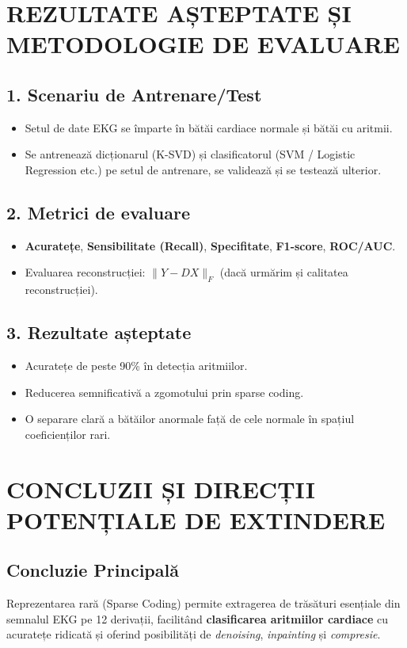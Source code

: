 \documentclass[12pt]{article}  %
\begin{document}
\section{REZULTATE AȘTEPTATE ȘI METODOLOGIE DE EVALUARE}

\subsection*{1. Scenariu de Antrenare/Test}
\begin{itemize}
    \item Setul de date EKG se împarte în bătăi cardiace normale și bătăi cu aritmii.
    \item Se antrenează dicționarul (K-SVD) și clasificatorul (SVM / Logistic Regression etc.) pe setul de antrenare, se validează și se testează ulterior.
\end{itemize}

\subsection*{2. Metrici de evaluare}
\begin{itemize}
    \item \textbf{Acuratețe}, \textbf{Sensibilitate (Recall)}, \textbf{Specifitate}, \textbf{F1-score}, \textbf{ROC/AUC}.
    \item Evaluarea reconstrucției: \(\|Y - D X\|_F\) (dacă urmărim și calitatea reconstrucției).
\end{itemize}

\subsection*{3. Rezultate așteptate}
\begin{itemize}
    \item Acuratețe de peste 90\% în detecția aritmiilor.
    \item Reducerea semnificativă a zgomotului prin sparse coding.
    \item O separare clară a bătăilor anormale față de cele normale în spațiul coeficienților rari.
\end{itemize}

\section{CONCLUZII ȘI DIRECȚII POTENȚIALE DE EXTINDERE}

\subsection*{Concluzie Principală}
Reprezentarea rară (Sparse Coding) permite extragerea de trăsături esențiale din semnalul EKG pe 12 derivații, facilitând \textbf{clasificarea aritmiilor cardiace} cu acuratețe ridicată și oferind posibilități de \emph{denoising}, \emph{inpainting} și \emph{compresie}.
\end{document}
